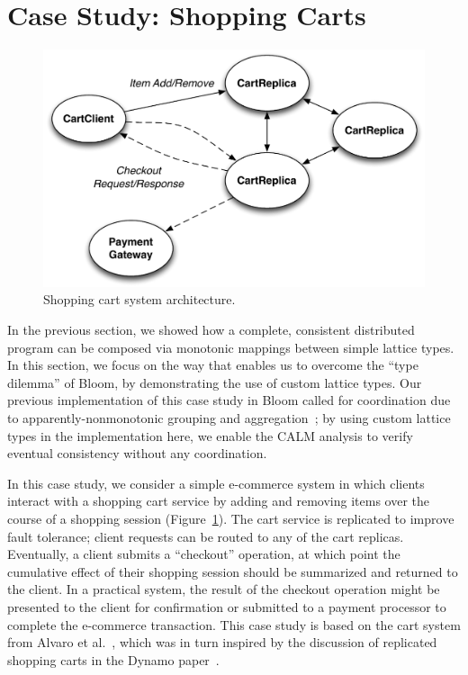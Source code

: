 \section{Case Study: Shopping Carts}
\label{sec:carts}

\begin{figure}[t]
\centering
\includegraphics[width=\linewidth]{fig/cart_arch.pdf}
\caption{Shopping cart system architecture.}
\label{fig:cart-system-arch}
\end{figure}

In the previous section, we showed how a complete, consistent distributed
program can be composed via monotonic mappings between simple lattice types. In
this section, we focus on the way that \lang enables us to overcome the ``type
dilemma'' of Bloom, by demonstrating the use of custom lattice types.  Our
previous implementation of this case study in Bloom called for coordination due
to apparently-nonmonotonic grouping and aggregation~\cite{Alvaro2011}; by using
custom lattice types in the implementation here, we enable the \lang CALM
analysis to verify eventual consistency without any coordination.

% 

In this case study, we consider a simple e-commerce system in which clients
interact with a shopping cart service by adding and removing items over the
course of a shopping session (Figure~\ref{fig:cart-system-arch}). The cart
service is replicated to improve fault tolerance; client requests can be routed
to any of the cart replicas. Eventually, a client submits a ``checkout''
operation, at which point the cumulative effect of their shopping session should
be summarized and returned to the client. In a practical system, the result of
the checkout operation might be presented to the client for confirmation or
submitted to a payment processor to complete the e-commerce transaction. This
case study is based on the cart system from Alvaro et al.~\cite{Alvaro2011},
which was in turn inspired by the discussion of replicated shopping carts in the
Dynamo paper~\cite{DeCandia2007}.

